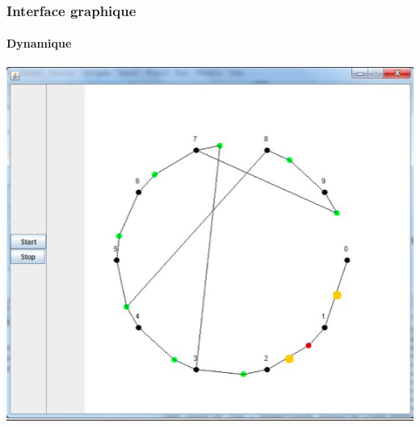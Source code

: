 
\begin{frame}
  \frametitle{Interface graphique}
  \framesubtitle{Dynamique}
  \includegraphics[scale=0.45]{include/ihmDyn.png}
\end{frame}
